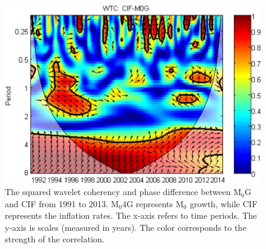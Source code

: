 \documentclass[a4paper,fleqn]{cas-sc}
\begin{document}
\begin{figure}[h]
    \centering
    \includegraphics[]{image/3.jpg}
    \caption{The squared wavelet coherency and phase difference between M$_0$G and CIF from 1991 to 2013. M$_0$4G represents M$_0$  growth, while CIF represents the inflation rates. The x-axis refers to time periods. The y-axis is scales (measured in years). The color corresponds to the strength of the correlation.}
\end{figure}

\section{}\label{sec:6}








\printcredits

%




\bio{}
\endbio

\endbio
\end{document}
